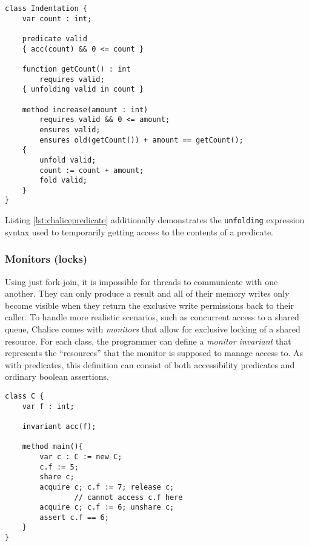 \begin{lstlisting}[language=Chalice,float,caption={Using the predicate \lstinline!valid! to hide the representation of \lstinline!Indentation!},label={lst:chalicepredicate}]
class Indentation {
    var count : int;

    predicate valid
    { acc(count) && 0 <= count }

    function getCount() : int
        requires valid;
    { unfolding valid in count }

    method increase(amount : int)
        requires valid && 0 <= amount;
        ensures valid;
        ensures old(getCount()) + amount == getCount();
    {
        unfold valid;
        count := count + amount;
        fold valid;
    }
}
\end{lstlisting}

Listing \ref{lst:chalicepredicate} additionally demonstrates the \lstinline[language=Chalice]!unfolding! expression syntax used to temporarily getting access to the contents of a predicate.

\subsubsection{Monitors (locks)}
Using just fork-join, it is impossible for threads to communicate with one another. 
They can only produce a result and all of their memory writes only become visible when they return the exclusive write permissions back to their caller.
To handle more realistic scenarios, such as concurrent access to a shared queue, Chalice comes with \emph{monitors} that allow for exclusive locking of a shared resource.
For each class, the programmer can define a \emph{monitor invariant} that represents the ``resources'' that the monitor is supposed to manage access to. 
As with predicates, this definition can consist of both accessibility predicates and ordinary boolean assertions.

\begin{lstlisting}[language=Chalice,float,caption={Example of the life-cycle an object can go through in Chalice},label={lst:chalicemoncycle}]
class C {
    var f : int;

    invariant acc(f);

    method main(){
        var c : C := new C;
        c.f := 5;
        share c;
        acquire c; c.f := 7; release c;
				// cannot access c.f here
        acquire c; c.f := 6; unshare c;
        assert c.f == 6;
    }
}
\end{lstlisting}

